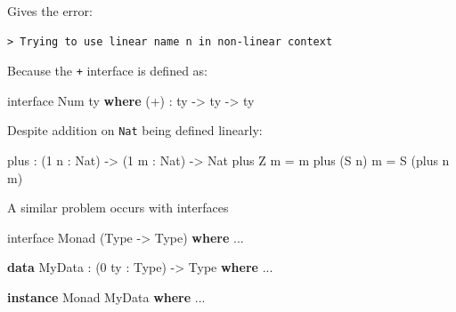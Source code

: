 \documentclass[
]{article}
\newenvironment{Shaded}{}{}
\newcommand{\DataTypeTok}[1]{\textcolor[rgb]{0.56,0.13,0.00}{#1}}
\newcommand{\DecValTok}[1]{\textcolor[rgb]{0.25,0.63,0.44}{#1}}
\newcommand{\KeywordTok}[1]{\textcolor[rgb]{0.00,0.44,0.13}{\textbf{#1}}}
\newcommand{\NormalTok}[1]{#1}
\newcommand{\OperatorTok}[1]{\textcolor[rgb]{0.40,0.40,0.40}{#1}}
\newcommand{\OtherTok}[1]{\textcolor[rgb]{0.00,0.44,0.13}{#1}}
\begin{document}
Gives the error:

\begin{verbatim}
> Trying to use linear name n in non-linear context
\end{verbatim}

Because the \texttt{+} interface is defined as:

\begin{Shaded}
\begin{Highlighting}[]
\NormalTok{interface }\DataTypeTok{Num}\NormalTok{ ty }\KeywordTok{where}
\NormalTok{    (}\OperatorTok{+}\NormalTok{) }\OperatorTok{:}\NormalTok{ ty }\OtherTok{{-}\textgreater{}}\NormalTok{ ty }\OtherTok{{-}\textgreater{}}\NormalTok{ ty}
\end{Highlighting}
\end{Shaded}

Despite addition on \texttt{Nat} being defined linearly:

\begin{Shaded}
\begin{Highlighting}[]
\NormalTok{plus }\OperatorTok{:}\NormalTok{ (}\DecValTok{1}\NormalTok{ n }\OperatorTok{:} \DataTypeTok{Nat}\NormalTok{) }\OtherTok{{-}\textgreater{}}\NormalTok{ (}\DecValTok{1}\NormalTok{ m }\OperatorTok{:} \DataTypeTok{Nat}\NormalTok{) }\OtherTok{{-}\textgreater{}} \DataTypeTok{Nat}
\NormalTok{plus }\DataTypeTok{Z}\NormalTok{ m }\OtherTok{=}\NormalTok{ m}
\NormalTok{plus (}\DataTypeTok{S}\NormalTok{ n) m }\OtherTok{=} \DataTypeTok{S}\NormalTok{ (plus n m)}
\end{Highlighting}
\end{Shaded}

A similar problem occurs with interfaces

\begin{Shaded}
\begin{Highlighting}[]
\NormalTok{interface }\DataTypeTok{Monad}\NormalTok{ (}\DataTypeTok{Type} \OtherTok{{-}\textgreater{}} \DataTypeTok{Type}\NormalTok{) }\KeywordTok{where}
    \OperatorTok{...}

\KeywordTok{data} \DataTypeTok{MyData} \OperatorTok{:}\NormalTok{ (}\DecValTok{0}\NormalTok{ ty }\OperatorTok{:} \DataTypeTok{Type}\NormalTok{) }\OtherTok{{-}\textgreater{}} \DataTypeTok{Type} \KeywordTok{where}
    \OperatorTok{...}

\KeywordTok{instance} \DataTypeTok{Monad} \DataTypeTok{MyData} \KeywordTok{where}
    \OperatorTok{...}
\end{Highlighting}
\end{Shaded}
\end{document}

